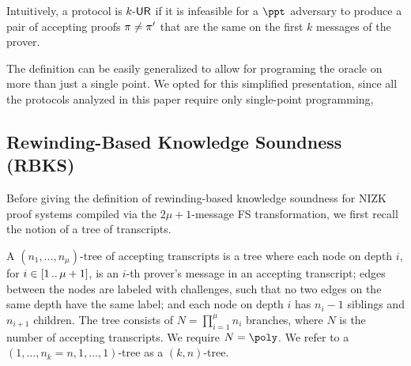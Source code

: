 Intuitively, a protocol is ${k\text{-}\mathsf{UR}}$ if it is infeasible for a $\ppt$ adversary to produce a pair of accepting proofs $\pi \neq \pi'$ that are the same on the first $k$ messages of the prover.  

The definition can be easily generalized to allow for programing the oracle on more than just a single point. We opted for this simplified presentation, since all the protocols analyzed in this paper require only single-point programming, 
  

\subsection{Rewinding-Based Knowledge Soundness (RBKS)}

Before giving the definition of rewinding-based knowledge soundness for NIZK proof systems compiled via the $2\mu + 1$-message FS transformation, we first recall the notion of a tree of transcripts.
\begin{definition}
	\label{def:tree_of_accepting_transcripts}
	A $(n_1,
  \ldots, n_\mu)$-tree of accepting transcripts is a tree where each node on
  depth $i$, for $i \in [1 \, .. \, \mu + 1]$, is an $i$-th prover's message in an
  accepting transcript; edges between the nodes are labeled with
  challenges, such that no two edges on the same depth have the same
  label; and each node on depth $i$ has $n_{i} - 1$ siblings and $n_{i +
    1}$ children. The tree consists of $N = \prod_{i = 1}^\mu n_i$
  branches, where $N$ is the number of accepting transcripts. We require $N = \poly$. We refer to a $(1, \ldots, n_k=n, 1, \ldots, 1)$-tree as a $(k,n)$-tree.
\end{definition}

\iffalse
		
